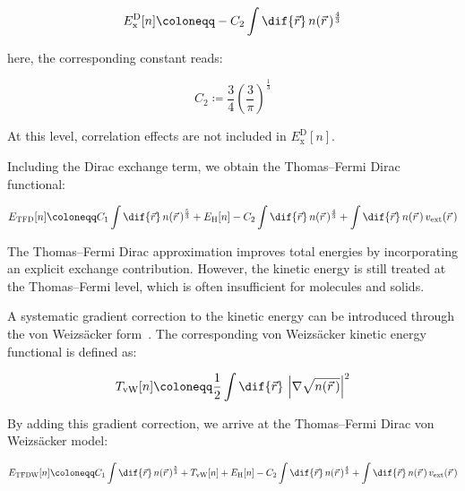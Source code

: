 \begin{equation}
    E_\mathrm{x}^\mathrm{D}[n]\coloneqq -C_2\int\dif{\vec{r}}\,n(\vec{r}\,)^{\frac{4}{3}}
\label{Dirac_exchange_functional}
\end{equation}

here, the corresponding constant reads:

\begin{equation}
    C_2 \coloneqq \frac{3}{4}\left(\frac{3}{\pi}\right)^{\frac{1}{3}}
\label{Dirac_exchange_constant}
\end{equation}

At this level, correlation effects are not included in $E_\mathrm{x}^\mathrm{D}[n]$.

Including the Dirac exchange term, we obtain the Thomas--Fermi Dirac functional:

\begin{equation}
    E_\mathrm{TFD}[n]
    \coloneqq C_1\int\dif{\vec{r}}\,n(\vec{r}\,)^{\frac{5}{3}}
    + E_\mathrm{H}[n]
    - C_2\int\dif{\vec{r}}\,n(\vec{r}\,)^{\frac{4}{3}}
    + \int\dif{\vec{r}}\,n(\vec{r}\,)\,v_\mathrm{ext}(\vec{r}\,)
\label{TFD_functional}
\end{equation}

The Thomas--Fermi Dirac approximation improves total energies by incorporating an explicit exchange contribution.
However, the kinetic energy is still treated at the Thomas--Fermi level, which is often insufficient for molecules and solids.

A systematic gradient correction to the kinetic energy can be introduced through the von Weizsäcker form~\cite{yang1986gradient}.
The corresponding von Weizsäcker kinetic energy functional is defined as:

\begin{equation}
    T_\mathrm{vW}[n]\coloneqq \frac{1}{2}\int\dif{\vec{r}}\,\left|\nabla\sqrt{n(\vec{r}\,)}\right|^2
\label{von_Weizsaecker_kinetic}
\end{equation}

By adding this gradient correction, we arrive at the Thomas--Fermi Dirac von Weizsäcker model:

\begin{equation}
    E_\mathrm{TFDW}[n]
    \coloneqq C_1\int\dif{\vec{r}}\,n(\vec{r}\,)^{\frac{5}{3}}
    + T_\mathrm{vW}[n]
    + E_\mathrm{H}[n]
    - C_2\int\dif{\vec{r}}\,n(\vec{r}\,)^{\frac{4}{3}}
    + \int\dif{\vec{r}}\,n(\vec{r}\,)\,v_\mathrm{ext}(\vec{r}\,)
\label{TFDW_functional}
\end{equation}

